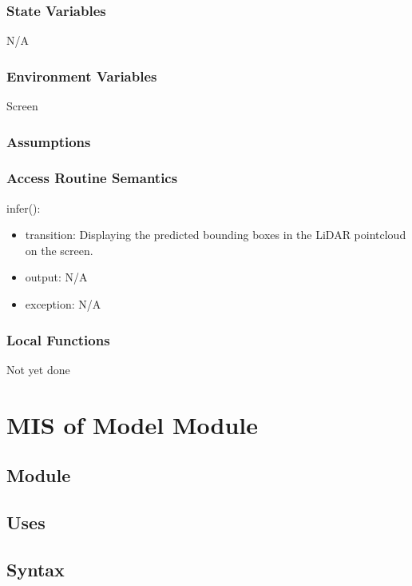 \documentclass[12pt, titlepage]{article}
\begin{document}
\subsubsection{State Variables}

N/A

\subsubsection{Environment Variables}

Screen

\subsubsection{Assumptions}



\subsubsection{Access Routine Semantics}


\noindent infer():
\begin{itemize}
\item transition: Displaying the predicted bounding boxes in the LiDAR pointcloud on the screen.
\item output: N/A
\item exception: N/A
\end{itemize}

\subsubsection{Local Functions}

Not yet done

\newpage

\section{MIS of Model Module} \label{Module} 

\subsection{Module}



\subsection{Uses}


\subsection{Syntax}
\end{document}

